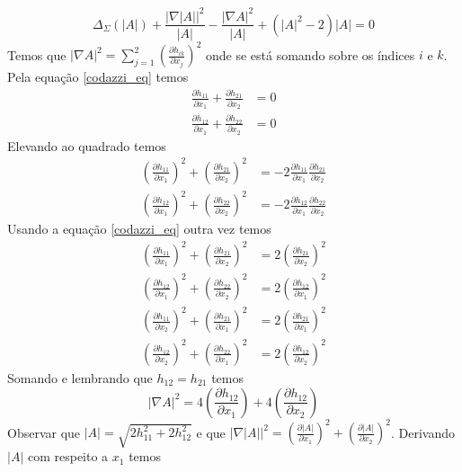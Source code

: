 \begin{demonstracao}
	\begin{equation}\label{edp_sff}
		\Delta_{\Sigma} (|A|) + \frac{|\nabla |A||^2}{|A|} - \frac{|\nabla A|^2}{|A|} + (|A|^2 - 2) |A| = 0
	\end{equation}	
	Temos que $ | \nabla A |^2 = \sum_{j=1}^2 \left( \frac{\partial h_{ik}}{\partial x_j} \right)^2 $ onde se está somando sobre os índices $i$ e $k$. Pela equação \eqref{codazzi_eq} temos
	\begin{align*}
		\frac{\partial h_{11}}{\partial x_1} + \frac{\partial h_{21}}{\partial x_2} &= 0\\
		\frac{\partial h_{12}}{\partial x_1} + \frac{\partial h_{22}}{\partial x_2} &= 0
	\end{align*}	
	Elevando ao quadrado temos
	\begin{align*}
		\left( \frac{\partial h_{11}}{\partial x_1} \right)^2 + \left( \frac{\partial h_{21}}{\partial x_2} \right)^2  &= - 2 \frac{\partial h_{11}}{\partial x_1} \frac{\partial h_{21}}{\partial x_2}  \\
		\left( \frac{\partial h_{12}}{\partial x_1} \right)^2 + \left( \frac{\partial h_{22}}{\partial x_2} \right)^2 &= - 2 \frac{\partial h_{12}}{\partial x_1} \frac{\partial h_{22}}{\partial x_2}
	\end{align*}	
	Usando a equação \eqref{codazzi_eq} outra vez temos
	\begin{align*}
		\left( \frac{\partial h_{11}}{\partial x_1} \right)^2 + \left( \frac{\partial h_{21}}{\partial x_2} \right)^2  &=  2  \left( \frac{\partial h_{21}}{\partial x_2} \right)^2  \\
		\left( \frac{\partial h_{12}}{\partial x_1} \right)^2 + \left( \frac{\partial h_{22}}{\partial x_2} \right)^2 &=  2 \left( \frac{\partial h_{12}}{\partial x_1} \right)^2\\
		\left( \frac{\partial h_{11}}{\partial x_2} \right)^2 + \left( \frac{\partial h_{21}}{\partial x_1} \right)^2  &= 2 \left( \frac{\partial h_{21}}{\partial x_1} \right)^2\\
		\left( \frac{\partial h_{12}}{\partial x_2} \right)^2 + \left( \frac{\partial h_{22}}{\partial x_1} \right)^2 &=  2 \left( \frac{\partial h_{12}}{\partial x_2} \right)^2  
	\end{align*}	
	Somando e lembrando que $h_{12} = h_{21}$ temos
	\begin{equation*}
		| \nabla A |^2 = 4 \left( \frac{\partial h_{12}}{\partial x_1} \right) + 4 \left( \frac{\partial h_{12}}{\partial x_2} \right)
	\end{equation*}	
	Observar que $ |A| = \sqrt{2 h_{11}^2 + 2 h_{12}^2} $ e que $ | \nabla |A| |^2 = \left( \frac{\partial |A|}{\partial x_1} \right)^2 + \left( \frac{\partial |A|}{\partial x_2} \right)^2 $. Derivando $ |A| $ com respeito a $x_1$ temos

\end{demonstracao}
